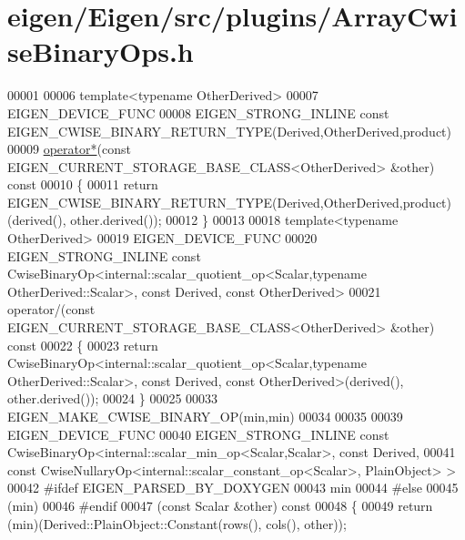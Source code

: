 \hypertarget{eigen_2_eigen_2src_2plugins_2_array_cwise_binary_ops_8h_source}{}\section{eigen/\+Eigen/src/plugins/\+Array\+Cwise\+Binary\+Ops.h}
\label{eigen_2_eigen_2src_2plugins_2_array_cwise_binary_ops_8h_source}

\begin{DoxyCode}
00001 
00006 \textcolor{keyword}{template}<\textcolor{keyword}{typename} OtherDerived>
00007 EIGEN\_DEVICE\_FUNC
00008 EIGEN\_STRONG\_INLINE \textcolor{keyword}{const} EIGEN\_CWISE\_BINARY\_RETURN\_TYPE(Derived,OtherDerived,product)
00009 \hyperlink{group___geometry___module_ga8f79e131479dbe709ee1173b1be9a8f0}{operator*}(\textcolor{keyword}{const} EIGEN\_CURRENT\_STORAGE\_BASE\_CLASS<OtherDerived> &other)\textcolor{keyword}{ const}
00010 \textcolor{keyword}{}\{
00011   \textcolor{keywordflow}{return} EIGEN\_CWISE\_BINARY\_RETURN\_TYPE(Derived,OtherDerived,product)(derived(), other.derived());
00012 \}
00013 
00018 \textcolor{keyword}{template}<\textcolor{keyword}{typename} OtherDerived>
00019 EIGEN\_DEVICE\_FUNC
00020 EIGEN\_STRONG\_INLINE \textcolor{keyword}{const} CwiseBinaryOp<internal::scalar\_quotient\_op<Scalar,typename OtherDerived::Scalar>,
       \textcolor{keyword}{const} Derived, \textcolor{keyword}{const} OtherDerived>
00021 operator/(\textcolor{keyword}{const} EIGEN\_CURRENT\_STORAGE\_BASE\_CLASS<OtherDerived> &other)\textcolor{keyword}{ const}
00022 \textcolor{keyword}{}\{
00023   \textcolor{keywordflow}{return} CwiseBinaryOp<internal::scalar\_quotient\_op<Scalar,typename OtherDerived::Scalar>, \textcolor{keyword}{const} Derived, \textcolor{keyword}{
      const} OtherDerived>(derived(), other.derived());
00024 \}
00025 
00033 EIGEN\_MAKE\_CWISE\_BINARY\_OP(min,min)
00034 
00035 
00039 EIGEN\_DEVICE\_FUNC
00040 EIGEN\_STRONG\_INLINE \textcolor{keyword}{const} CwiseBinaryOp<internal::scalar\_min\_op<Scalar,Scalar>, \textcolor{keyword}{const} Derived,
00041                                         \textcolor{keyword}{const} CwiseNullaryOp<internal::scalar\_constant\_op<Scalar>, 
      PlainObject> >
00042 \textcolor{preprocessor}{#ifdef EIGEN\_PARSED\_BY\_DOXYGEN}
00043 min
00044 \textcolor{preprocessor}{#else}
00045 (min)
00046 #endif
00047 (\textcolor{keyword}{const} Scalar &other)\textcolor{keyword}{ const}
00048 \textcolor{keyword}{}\{
00049   \textcolor{keywordflow}{return} (min)(Derived::PlainObject::Constant(rows(), cols(), other));

\end{DoxyCode}
